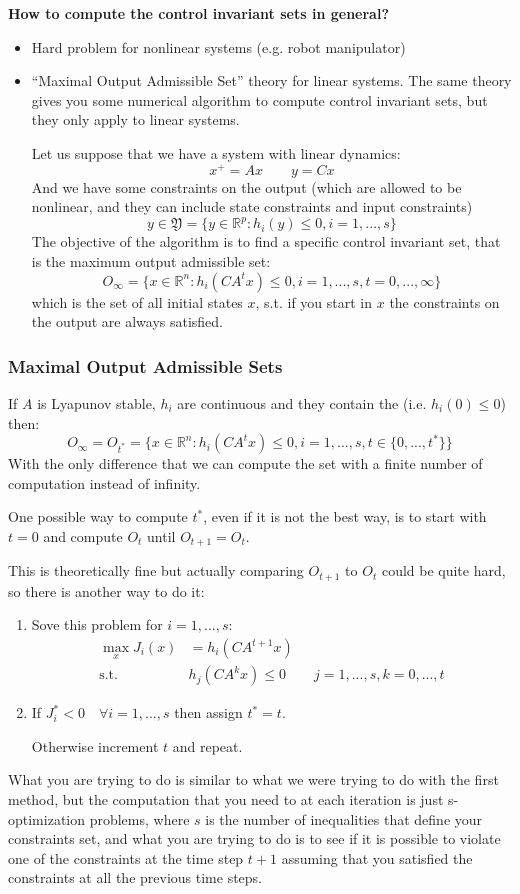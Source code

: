 \begin{center}
\textbf{How to compute the control invariant sets in general?}
\end{center}
\begin{itemize}
\item Hard problem for nonlinear systems (e.g. robot manipulator)
\item ``Maximal Output Admissible Set'' theory for linear systems. The same theory gives you some numerical algorithm to compute control invariant sets, but they only apply to linear systems.

Let us suppose that we have a system with linear dynamics:
\[x^+ = Ax\qquad y=Cx\]
And we have some constraints on the output (which are allowed to be nonlinear, and they can include state constraints and input constraints)
\[y\in\mathfrak{Y} = \{y\in\mathbb{R}^p: h_i(y)\le 0, i=1,...,s\}\]
The objective of the algorithm is to find a specific control invariant set, that is the maximum output admissible set:
\[O_{\infty} = \{x\in\mathbb{R}^n: h_i(CA^tx)\le 0, i=1,...,s, t=0,...,\infty\}\]
which is the set of all initial states $x$, s.t. if you start in $x$ the constraints on the output are always satisfied.
\end{itemize}

\subsubsection{Maximal Output Admissible Sets}
\begin{theorem}
If $A$ is Lyapunov stable, $h_i$ are continuous and they contain the  (i.e. $h_i(0)\le0$) then:
\[O_{\infty} = O_{t^*} = \{x\in\mathbb{R}^n: h_i(CA^tx)\le 0, i=1,...,s, t\in\{0, ..., t^*\}\}\]
With the only difference that we can compute the set with a finite number of computation instead of infinity.
\end{theorem}
One possible way to compute $t^*$, even if it is not the best way, is to start with $t=0$ and compute $O_t$ until $O_{t+1}=O_t$.

This is theoretically fine but actually comparing $O_{t+1}$ to $O_t$ could be quite hard, so there is another way to do it:
\begin{enumerate}
\item Sove this problem for $i=1,...,s$:
\begin{align*}
\max_x J_i(x) &= h_i(CA^{t+1}x)\\
\text{s.t. } & h_j(CA^kx)\le 0\qquad j=1,...,s , k=0,...,t
\end{align*}
\item If $J_i^* < 0 \quad \forall i = 1,...,s$ then assign $t^* = t$.

Otherwise increment $t$ and repeat.
\end{enumerate}
What you are trying to do is similar to what we were trying to do with the first method, but the computation that you need to at each iteration is just s-optimization problems, where $s$ is the number of inequalities that define your constraints set, and what you are trying to do is to see if it is possible to violate one of the constraints at the time step  $t+1$ assuming that you satisfied the constraints at all the previous time steps.

